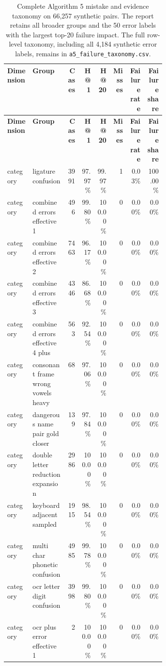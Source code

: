 \begin{landscape}
\begin{tiny}
\setlength{\tabcolsep}{0.8pt}
\renewcommand{\arraystretch}{1.05}
\begin{longtable}{@{}L{0.16\linewidth}L{0.22\linewidth}rrrrrr@{}}
\caption{Complete Algorithm 5 mistake and evidence taxonomy on 66,257 synthetic pairs. The report retains all broader groups and the 50 error labels with the largest top-20 failure impact. The full row-level taxonomy, including all 4,184 synthetic error labels, remains in \texttt{a5\_failure\_taxonomy.csv}.}\label{tab:expanded-a5-synthetic-taxonomy}\\
\toprule
\textbf{Dimension} & \textbf{Group} & \textbf{Cases} & \textbf{H@1} & \textbf{H@20} & \textbf{Misses} & \textbf{Failure rate} & \textbf{Failure share} \\
\midrule
\endfirsthead
\toprule
\textbf{Dimension} & \textbf{Group} & \textbf{Cases} & \textbf{H@1} & \textbf{H@20} & \textbf{Misses} & \textbf{Failure rate} & \textbf{Failure share} \\
\midrule
\endhead
category & ligature confusion & 3991 & 97.97\% & 99.97\% & 1 & 0.03\% & 100.00\% \\
category & combined errors effective 1 & 496 & 99.80\% & 100.00\% & 0 & 0.00\% & 0.00\% \\
category & combined errors effective 2 & 7463 & 96.17\% & 100.00\% & 0 & 0.00\% & 0.00\% \\
category & combined errors effective 3 & 4346 & 86.68\% & 100.00\% & 0 & 0.00\% & 0.00\% \\
category & combined errors effective 4 plus & 563 & 92.54\% & 100.00\% & 0 & 0.00\% & 0.00\% \\
category & consonant frame wrong vowels heavy & 68 & 97.06\% & 100.00\% & 0 & 0.00\% & 0.00\% \\
category & dangerous name pair gold closer & 139 & 97.84\% & 100.00\% & 0 & 0.00\% & 0.00\% \\
category & double letter reduction expansion & 2986 & 100.00\% & 100.00\% & 0 & 0.00\% & 0.00\% \\
category & keyboard adjacent sampled & 1915 & 98.54\% & 100.00\% & 0 & 0.00\% & 0.00\% \\
category & multi char phonetic confusion & 4985 & 99.78\% & 100.00\% & 0 & 0.00\% & 0.00\% \\
category & ocr letter digit confusion & 3998 & 99.80\% & 100.00\% & 0 & 0.00\% & 0.00\% \\
category & ocr plus error effective 1 & 2 & 100.00\% & 100.00\% & 0 & 0.00\% & 0.00\% \\

\end{longtable}
\end{tiny}
\end{landscape}
